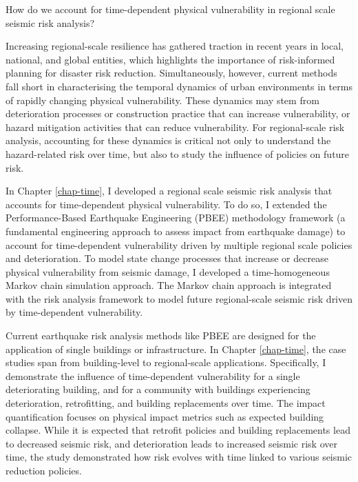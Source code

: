 \begin{center} \begin{blockquote}
How do we account for time-dependent physical vulnerability in regional scale seismic risk analysis?
\end{blockquote} \end{center}

Increasing regional-scale resilience has gathered traction in recent years in local, national, and global entities, which highlights the importance of risk-informed planning for disaster risk reduction. Simultaneously, however, current methods fall short in characterising the temporal dynamics of urban environments in terms of rapidly changing physical vulnerability. These dynamics may stem from deterioration processes or construction practice that can increase vulnerability, or hazard mitigation activities that can reduce vulnerability. For regional-scale risk analysis, accounting for these dynamics is critical not only to understand the hazard-related risk over time, but also to study the influence of policies on future risk.

In Chapter \ref{chap-time}, I developed a regional scale seismic risk analysis that accounts for time-dependent physical vulnerability. To do so, I extended the Performance-Based Earthquake Engineering (PBEE) methodology \citep{krawinkler2004performance} framework (a fundamental engineering approach to assess impact from earthquake damage) to account for time-dependent vulnerability driven by multiple regional scale policies and deterioration. To model state change processes that increase or decrease physical vulnerability from seismic damage, I developed a time-homogeneous Markov chain simulation approach. The Markov chain approach is integrated with the risk analysis framework to model future regional-scale seismic risk driven by time-dependent vulnerability.

Current earthquake risk analysis methods like PBEE are designed for the application of single buildings or infrastructure. In Chapter \ref{chap-time}, the case studies span from building-level to regional-scale applications. Specifically, I demonstrate the influence of time-dependent vulnerability for a single deteriorating building, and for a community with buildings experiencing deterioration, retrofitting, and building replacements over time. The impact quantification focuses on physical impact metrics such as expected building collapse. While it is expected that retrofit policies and building replacements lead to decreased seismic risk, and deterioration leads to increased seismic risk over time, the study demonstrated how risk evolves with time linked to various seismic reduction policies.

